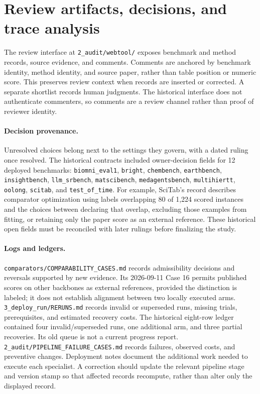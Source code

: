 \section{Review artifacts, decisions, and trace analysis}
\label{app:review}

The review interface at \texttt{2\_audit/webtool/} exposes benchmark and method records,
source evidence, and comments. Comments are anchored by benchmark identity, method identity,
and source paper, rather than table position or numeric score. This preserves review context
when records are inserted or corrected. A separate shortlist records human judgments. The
historical interface does not authenticate commenters, so comments are a review channel rather
than proof of reviewer identity.

\paragraph{Decision provenance.}
Unresolved choices belong next to the settings they govern, with a dated ruling once resolved.
The historical contracts included owner-decision fields for 12 deployed benchmarks:
\texttt{biomni\_eval1}, \texttt{bright}, \texttt{chembench}, \texttt{earthbench},
\texttt{insightbench}, \texttt{llm\_srbench}, \texttt{matscibench}, \texttt{medagentsbench},
\texttt{multihiertt}, \texttt{oolong}, \texttt{scitab}, and \texttt{test\_of\_time}.
For example, SciTab's record describes comparator optimization using labels overlapping 80 of
1{,}224 scored instances and the choices between declaring that overlap, excluding those
examples from fitting, or retaining only the paper score as an external reference. These
historical open fields must be reconciled with later rulings before finalizing the study.

\paragraph{Logs and ledgers.}
\texttt{comparators/COMPARABILITY\_CASES.md} records admissibility decisions and reversals
supported by new evidence. Its 2026-09-11 Case 16 permits published scores on other backbones
as external references, provided the distinction is labeled; it does not establish alignment
between two locally executed arms. \texttt{3\_deploy\_run/RERUNS.md} records invalid or
superseded runs, missing trials, prerequisites, and estimated recovery costs. The historical
eight-row ledger contained four invalid/superseded runs, one additional arm, and three partial
recoveries. Its old queue is not a current progress report.
\texttt{2\_audit/PIPELINE\_FAILURE\_CASES.md} records failures, observed costs, and preventive
changes. Deployment notes document the additional work needed to execute each specialist.
A correction should update the relevant pipeline stage and version stamp so that affected
records recompute, rather than alter only the displayed record.

